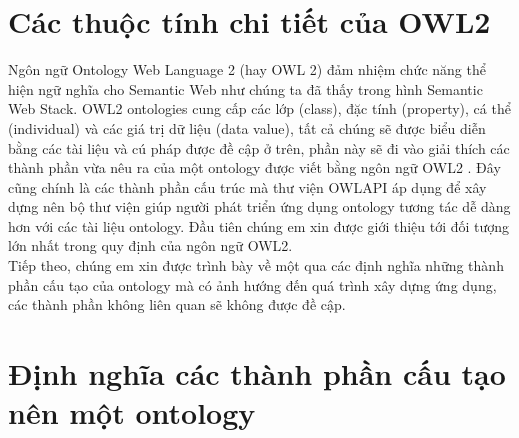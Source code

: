 \section{Các thuộc tính chi tiết của OWL2}
Ngôn ngữ Ontology Web Language 2 (hay OWL 2) đảm nhiệm chức năng thể hiện ngữ nghĩa cho Semantic Web như chúng ta đã thấy trong hình Semantic Web Stack. OWL2 ontologies cung cấp các lớp (class), đặc tính (property), cá thể (individual) và các giá trị dữ liệu (data value), tất cả chúng sẽ được biểu diễn bằng các tài liệu và cú pháp được đề cập ở trên, phần này sẽ đi vào giải thích các thành phần vừa nêu ra của một ontology được viết bằng ngôn ngữ OWL2 . Đây cũng chính là các thành phần cấu trúc mà thư viện OWLAPI \cite{owlapi} áp dụng để xây dựng nên bộ thư viện giúp người phát triển ứng dụng ontology tương tác dễ dàng hơn với các tài liệu ontology.
Đầu tiên chúng em xin được giới thiệu tới đối tượng lớn nhất trong quy định của ngôn ngữ OWL2. 
\\
Tiếp theo, chúng em xin được trình bày về một qua các định nghĩa những thành phần cấu tạo của ontology mà có ảnh hướng đến quá trình xây dựng ứng dụng, các thành phần không liên quan sẽ không được đề cập.
\section{Định nghĩa các thành phần cấu tạo nên một ontology}
